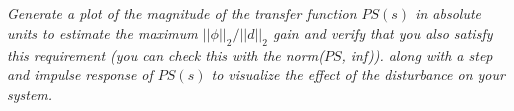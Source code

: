 \documentclass{article}
\begin{document}
\subsection{}
\textit{Generate a plot of the magnitude of the transfer function $PS(s)$ in absolute units to estimate the maximum $||\phi||_2/||d||_2$ gain and verify that you also satisfy this requirement (you can check this with the norm($PS$, inf)). along with a step and impulse response of $PS(s)$ to visualize the effect of the disturbance on your system.}

\end{document}
